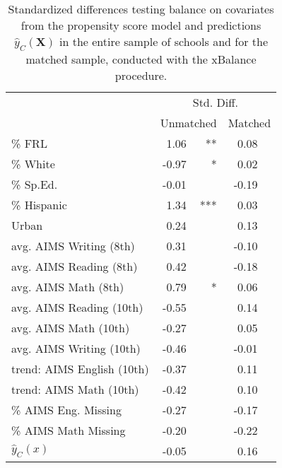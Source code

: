\documentclass[12pt]{article}\usepackage[]{graphicx}\usepackage[]{color}
\newcommand{\yhat}{\hat{y}_C}
\newcommand{\covMat}{\bm{X}}
\newcommand{\covVec}{x}
\begin{document}
\begin{table}[ht]
\centering
\begin{tabular}{lrrrr}
  \hline
  & \multicolumn{4}{c}{Std. Diff.} \\
 &\multicolumn{2}{c}{Unmatched}&\multicolumn{2}{c}{Matched}\\
 \hline
\% FRL & 1.06 & **  & 0.08 &     \\ 
  \% White & -0.97 & *   & 0.02 &     \\ 
  \% Sp.Ed. & -0.01 &     & -0.19 &     \\ 
  \% Hispanic & 1.34 & *** & 0.03 &     \\ 
  Urban & 0.24 &     & 0.13 &     \\ 
  avg. AIMS Writing (8th) & 0.31 &     & -0.10 &     \\ 
  avg. AIMS Reading (8th) & 0.42 &     & -0.18 &     \\ 
  avg. AIMS Math (8th) & 0.79 & *   & 0.06 &     \\ 
  avg. AIMS Reading (10th) & -0.55 &     & 0.14 &     \\ 
  avg. AIMS Math (10th) & -0.27 &     & 0.05 &     \\ 
  avg. AIMS Writing (10th) & -0.46 &     & -0.01 &     \\ 
  trend: AIMS English (10th) & -0.37 &     & 0.11 &     \\ 
  trend: AIMS Math (10th) & -0.42 &     & 0.10 &     \\ 
  \% AIMS Eng. Missing & -0.27 &     & -0.17 &     \\ 
  \% AIMS Math Missing & -0.20 &     & -0.22 &     \\ 
  $\yhat (\covVec)$ & -0.05 &     & 0.16 &     \\ 
   \hline
\end{tabular}
\caption{Standardized differences testing balance on
  covariates from the propensity score model and predictions $\hat{y}_C(\covMat)$ in the entire sample of schools and for the matched sample, conducted with the xBalance procedure.} 
\label{table:balance}
\end{table}
\end{document}
